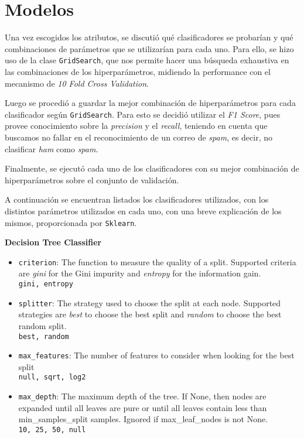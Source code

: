 \section{Modelos}

Una vez escogidos los atributos, se discutió qué clasificadores se probarían y qué combinaciones de parámetros que se utilizar\'ian para cada uno. Para ello, se hizo uso de la clase \texttt{GridSearch}\textsuperscript{\cite{gridsearch}}, que nos permite hacer una b\'usqueda exhaustiva en las combinaciones de los hiperpar\'ametros, midiendo la performance con el mecanismo de \emph{10 Fold Cross Validation}.

Luego se procedió a guardar la mejor combinación de hiperparámetros para cada clasificador según \texttt{GridSearch}. Para esto se decidió utilizar el \emph{F1 Score}, pues provee conocimiento sobre la \emph{precision} y el \emph{recall}, teniendo en cuenta que buscamos no fallar en el reconocimiento de un correo de \emph{spam}, es decir, no clasificar \emph{ham} como \emph{spam}.

Finalmente, se ejecut\'o cada uno de los clasificadores con su mejor combinación de hiperparámetros sobre el conjunto de validación.

\noindent A continuaci\'on se encuentran listados los clasificadores utilizados, con los distintos par\'ametros utilizados en cada uno, con una breve explicaci\'on de los mismos, proporcionada por \texttt{Sklearn}.

\noindent \textbf{Decision Tree Classifier}
\begin{itemize}
	\item \texttt{criterion}: The function to measure the quality of a split. Supported criteria are \emph{gini} for the Gini impurity and \emph{entropy} for the information gain.\\
	\texttt{gini, entropy}
	\item \texttt{splitter}: The strategy used to choose the split at each node. Supported strategies are \emph{best} to choose the best split and \emph{random} to choose the best random split.\\
	\texttt{best, random}
	\item \texttt{max\_features}: The number of features to consider when looking for the best split\\
	\texttt{null, sqrt, log2}
	\item \texttt{max\_depth}: The maximum depth of the tree. If None, then nodes are expanded until all leaves are pure or until all leaves contain less than min\_samples\_split samples. Ignored if max\_leaf\_nodes is not None.\\
	\texttt{10, 25, 50, null}
\end{itemize}

